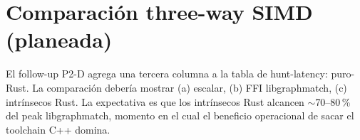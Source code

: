 \section{Comparación three-way SIMD (planeada)}

El follow-up P2-D agrega una tercera columna a la tabla de
hunt-latency:  puro-Rust. La comparación
debería mostrar (a) escalar, (b) FFI libgraphmatch, (c)
intrínsecos Rust. La expectativa es que los intrínsecos Rust
alcancen $\sim$70--80\,\% del peak libgraphmatch, momento en el
cual el beneficio operacional de sacar el toolchain C++ domina.
